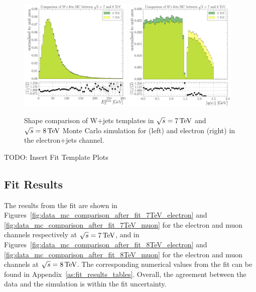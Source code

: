 \begin{figure}[hbtp]
    \centering
     \includegraphics[width=0.48\textwidth]{Chapters/04_Analysis/04b_XSections/images/WJets_comparison/TTbar_plus_X_analysis_EPlusJets_Refselection_MET_patType1CorrectedPFMet_MET_0orMoreBtag.pdf}\hfill
     \includegraphics[width=0.48\textwidth]{Chapters/04_Analysis/04b_XSections/images/WJets_comparison/TTbar_plus_X_analysis_EPlusJets_Refselection_Electron_electron_AbsEta_0orMoreBtag.pdf}\\
	 \caption{Shape comparison of W+jets templates in $\sqrt{s}=7\,\text{Te\hspace{-.08em}V}$ and $\sqrt{s}=8\,\text{Te\hspace{-.08em}V}$ Monte Carlo
	 simulation for \met (left) and electron \abseta (right) in the electron+jets channel.}
     \label{fig:wjets_7TeV_8TeV_comparison}
\end{figure}

TODO: Insert Fit Template Plots

\subsection{Fit Results}
\label{ss:fit_results}
The results from the fit are shown in Figures~\ref{fig:data_mc_comparison_after_fit_7TeV_electron} and
\ref{fig:data_mc_comparison_after_fit_7TeV_muon} for the electron and muon channels respectively at
$\sqrt{s}=7\,\text{Te\hspace{-.08em}V}$, and in Figures~\ref{fig:data_mc_comparison_after_fit_8TeV_electron} and
\ref{fig:data_mc_comparison_after_fit_8TeV_muon} for the electron and muon channels at $\sqrt{s}=8\,\text{Te\hspace{-.08em}V}$. The
corresponding numerical values from the fit can be found in Appendix~\ref{as:fit_results_tables}. Overall, the
agreement between the data and the simulation is within the fit uncertainty. 

